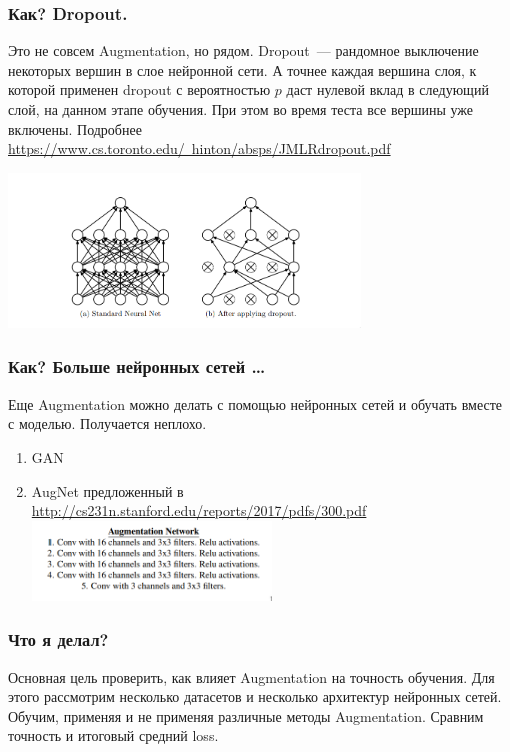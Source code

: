 \documentclass{beamer}
\begin{document}
\begin{frame}
  \frametitle{Как? Dropout.}
  Это не совсем Augmentation, но рядом. Dropout~--- рандомное выключение
  некоторых вершин в слое нейронной сети. А точнее каждая вершина слоя, к
  которой применен dropout с вероятностью $p$ даст нулевой вклад в следующий
  слой, на данном этапе обучения. При этом во время теста все вершины уже
  включены. Подробнее 
  \href{https://www.cs.toronto.edu/~hinton/absps/JMLRdropout.pdf}
  {https://www.cs.toronto.edu/~hinton/absps/JMLRdropout.pdf}
  \begin{center}
  \includegraphics[trim=0 0 0 1cm, width=0.7\textwidth]{dropout.png}
  \end{center}
\end{frame}

\begin{frame}
  \frametitle{Как? Больше нейронных сетей \dots}
  Еще Augmentation можно делать с помощью нейронных сетей и обучать вместе с
  моделью. Получается неплохо.
  \begin{enumerate}
  \item GAN
  \item AugNet предложенный в
    \href{http://cs231n.stanford.edu/reports/2017/pdfs/300.pdf}
    {http://cs231n.stanford.edu/reports/2017/pdfs/300.pdf}
    \includegraphics[width=0.5\textwidth]{augnet.png}
  \end{enumerate}
\end{frame}

\begin{frame}
  \frametitle{Что я делал?}
  Основная цель проверить, как влияет Augmentation на точность обучения.
  Для этого рассмотрим несколько датасетов и несколько архитектур нейронных
  сетей. Обучим, применяя и не применяя различные методы Augmentation. Сравним
  точность и итоговый средний loss. 
\end{frame}
\end{document}
